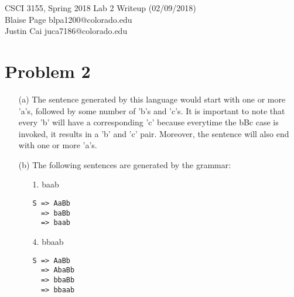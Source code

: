 \documentclass[12pt]{article}
\newcommand\tab[1][1cm]{\hspace*{#1}} %
\begin{document}
CSCI 3155, Spring 2018 \hfill Lab 2 Writeup  (02/09/2018)\\
Blaise Page  \hfill blpa1200@colorado.edu\\
Justin Cai \hfill juca7186@colorado.edu\vspace{-13mm}\\

\hrulefill

{\selectfont\vspace{-8mm}
\section*{{\selectfont Problem 2}}\vspace{-10mm}
\begin{enumerate}

\item[(a)] 
\tab The sentence generated by this language would start with one or more 'a's, followed by some number of 'b's and 'c's. It is important to note that every 'b' will have a corresponding 'c' because everytime the bBc case is invoked, it results in a 'b' and 'c' pair. Moreover, the sentence will also end with one or more 'a's.

\item[(b)] 
The following sentences are generated by the grammar:
\begin{enumerate}
\item[1.] baab
\begin{verbatim}
S => AaBb
  => baBb
  => baab
\end{verbatim}
\item[4.] bbaab
\begin{verbatim}
S => AaBb
  => AbaBb
  => bbaBb
  => bbaab
\end{verbatim}
\end{enumerate}


\end{enumerate}}
\end{document}
